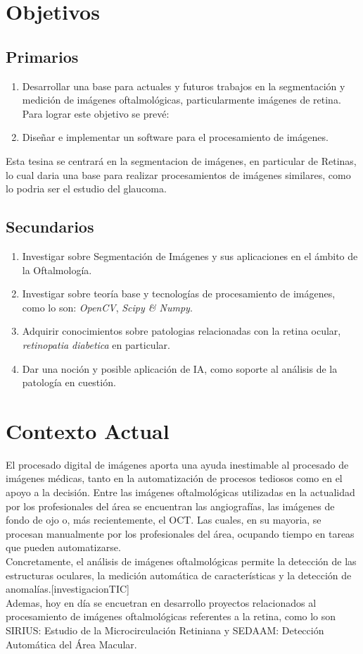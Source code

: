 \documentclass[14pt]{article}
\begin{document}
\section{Objetivos}
\subsection{Primarios}
\begin{enumerate}
	\item Desarrollar una base para actuales y futuros trabajos en la segmentación y medición de imágenes oftalmológicas, particularmente imágenes de retina.\\[0.3cm]
        Para lograr este objetivo se prevé:
	\item Diseñar e implementar un software para el procesamiento de imágenes.
\end{enumerate}
Esta tesina se centrará en la segmentacion de imágenes, en particular de Retinas, lo cual daria una base para realizar procesamientos de imágenes similares, como lo podria ser el estudio del glaucoma.\\
\subsection{Secundarios}
\begin{enumerate}
	\item Investigar sobre Segmentación de Imágenes y sus aplicaciones en el ámbito de la Oftalmología.
	\item Investigar sobre teoría base y tecnologías de procesamiento de imágenes, como lo son: \emph{OpenCV}, \emph{Scipy \& Numpy}.
	\item Adquirir conocimientos sobre patologias relacionadas con la retina ocular, \emph{retinopatia diabetica} en particular. 
	\item Dar una noción y posible aplicación de IA, como soporte al análisis de la patología en cuestión.
\end{enumerate}


\section{Contexto Actual}


El procesado digital de imágenes aporta una ayuda inestimable al procesado de imágenes médicas, tanto en la automatización de procesos tediosos como en el apoyo a la decisión. Entre las imágenes oftalmológicas utilizadas en la actualidad por los profesionales del área se encuentran las angiografías, las imágenes de fondo de ojo o, más recientemente, el OCT. Las cuales, en su mayoria, se procesan manualmente por los profesionales del área, ocupando tiempo en tareas que pueden automatizarse.\\[0.5cm] Concretamente, el análisis de imágenes oftalmológicas permite la detección de las estructuras oculares, la medición automática de características y la detección de anomalías.[investigacionTIC]\\[0.5cm]
Ademas, hoy en día se encuetran en desarrollo proyectos relacionados al procesamiento de imágenes oftalmológicas referentes a la retina, como lo son  SIRIUS: Estudio de la Microcirculación Retiniana y SEDAAM: Detección Automática del Área Macular.
\end{document}
